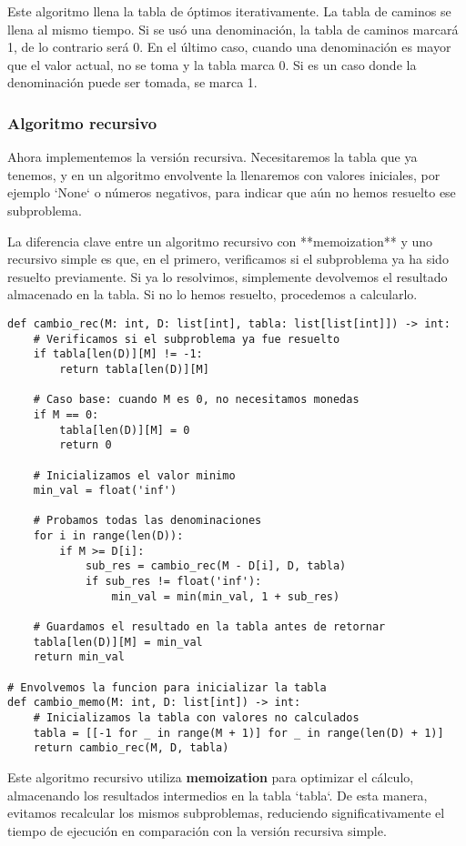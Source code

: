 Este algoritmo llena la tabla de óptimos iterativamente. La tabla de caminos se llena al mismo tiempo. Si se usó una denominación, la tabla de caminos marcará 1, de lo contrario será 0. En el último caso, cuando una denominación es mayor que el valor actual, no se toma y la tabla marca 0. Si es un caso donde la denominación puede ser tomada, se marca 1.

\subsubsection{Algoritmo recursivo}

Ahora implementemos la versión recursiva. Necesitaremos la tabla que ya tenemos, y en un algoritmo envolvente la llenaremos con valores iniciales, por ejemplo `None` o números negativos, para indicar que aún no hemos resuelto ese subproblema.

La diferencia clave entre un algoritmo recursivo con **memoization** y uno recursivo simple es que, en el primero, verificamos si el subproblema ya ha sido resuelto previamente. Si ya lo resolvimos, simplemente devolvemos el resultado almacenado en la tabla. Si no lo hemos resuelto, procedemos a calcularlo.

\begin{lstlisting}
def cambio_rec(M: int, D: list[int], tabla: list[list[int]]) -> int:
    # Verificamos si el subproblema ya fue resuelto
    if tabla[len(D)][M] != -1:
        return tabla[len(D)][M]

    # Caso base: cuando M es 0, no necesitamos monedas
    if M == 0:
        tabla[len(D)][M] = 0
        return 0

    # Inicializamos el valor minimo
    min_val = float('inf')

    # Probamos todas las denominaciones
    for i in range(len(D)):
        if M >= D[i]:
            sub_res = cambio_rec(M - D[i], D, tabla)
            if sub_res != float('inf'):
                min_val = min(min_val, 1 + sub_res)

    # Guardamos el resultado en la tabla antes de retornar
    tabla[len(D)][M] = min_val
    return min_val

# Envolvemos la funcion para inicializar la tabla
def cambio_memo(M: int, D: list[int]) -> int:
    # Inicializamos la tabla con valores no calculados
    tabla = [[-1 for _ in range(M + 1)] for _ in range(len(D) + 1)]
    return cambio_rec(M, D, tabla)
\end{lstlisting}

Este algoritmo recursivo utiliza \textbf{memoization} para optimizar el cálculo, almacenando los resultados intermedios en la tabla `tabla`. De esta manera, evitamos recalcular los mismos subproblemas, reduciendo significativamente el tiempo de ejecución en comparación con la versión recursiva simple.

